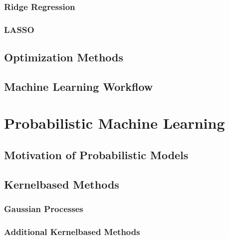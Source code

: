 \documentclass[letterpaper,10pt,english]{jupyterBook}
\begin{document}
\section{Ridge Regression}
\label{\detokenize{fund/linregr:ridge-regression}}

\section{LASSO}
\label{\detokenize{fund/linregr:lasso}}

\chapter{Optimization Methods}
\label{\detokenize{fund/opt:optimization-methods}}\label{\detokenize{fund/opt::doc}}

\chapter{Machine Learning Workflow}
\label{\detokenize{fund/MLworkflow:machine-learning-workflow}}\label{\detokenize{fund/MLworkflow::doc}}

\part{Probabilistic Machine Learning}


\chapter{Motivation of Probabilistic Models}
\label{\detokenize{probML/motivation:motivation-of-probabilistic-models}}\label{\detokenize{probML/motivation::doc}}

\chapter{Kernel\sphinxhyphen{}based Methods}
\label{\detokenize{probML/kernelmethods:kernel-based-methods}}\label{\detokenize{probML/kernelmethods::doc}}

\section{Gaussian Processes}
\label{\detokenize{probML/kernelmethods:gaussian-processes}}

\section{Additional Kernel\sphinxhyphen{}based Methods}
\label{\detokenize{probML/kernelmethods:additional-kernel-based-methods}}
\end{document}
